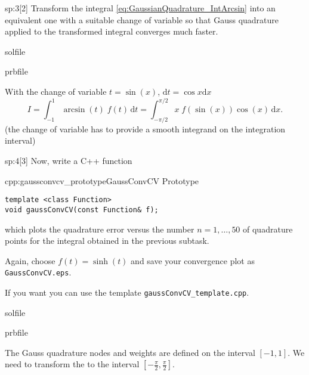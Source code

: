 \begin{samproblem}

\begin{subproblem}{sp:3}[2] 
  Transform the integral \eqref{eq:GaussianQuadrature_IntArcsin} into an equivalent one with a suitable
  change of variable so that Gauss quadrature applied to the transformed integral converges much faster.

  \begin{samwriteprbpart}{solfile}
    \begin{writeverbatim}{prbfile}
      \begin{samsolution}
        With the change of variable $t=\sin(x)$, $\mathrm{d}t=\cos x\mathrm{d}x$
        $$I = \int_{-1}^{1} \arcsin(t)\; f(t) \,\mathrm{d}t  = \int_{-\pi/2}^{\pi/2} x\; f(\sin(x))\cos(x)\,\mathrm{d}x.$$
        (the change of variable has to provide a smooth integrand on the integration interval)
     \end{samsolution}
    \end{writeverbatim}
  \end{samwriteprbpart}

\end{subproblem}

\begin{subproblem}{sp:4}[3]
Now, write a C++ function
  \begin{samcode}[C++-code]{cpp:gaussconvcv_prototype}{GaussConvCV Prototype}
    \begin{lstlisting}[style=cpp]
template <class Function>
void gaussConvCV(const Function& f);
    \end{lstlisting}
  \end{samcode}
  which plots the quadrature error versus the number $n=1,\ldots,50$ of quadrature points for the integral obtained in the previous subtask.

  Again, choose $f(t)=\sinh(t)$ and save your convergence plot as \texttt{GaussConvCV.eps}.
  
  \begin{samhint}
    If you want you can use the template \texttt{gaussConvCV\_template.cpp}. 
  \end{samhint}

  \begin{samwriteprbpart}{solfile}
    \begin{writeverbatim}{prbfile}
      \begin{samsolution}
        The Gauss quadrature nodes and weights are defined on the interval $[-1,1]$.
        We need to transform the to the interval $[-\frac{\pi}{2}, \frac{\pi}{2}]$.


\end{samsolution}
\end{writeverbatim}
\end{samwriteprbpart}
\end{subproblem}
\end{samproblem}
